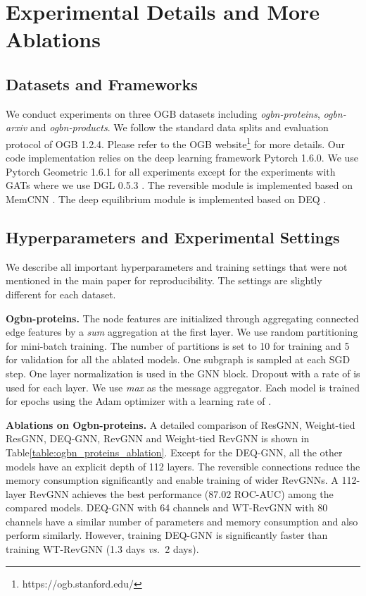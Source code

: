 \documentclass{article}
\newcommand{\vs}{\emph{vs.~}}
\newcommand{\tblLabel}{Table\xspace}
\newcommand{\mysection}[1]{\vspace{0pt}\noindent\textbf{#1.}}
\begin{document}
\section{Experimental Details and More Ablations}

\subsection{Datasets and Frameworks}
We conduct experiments on three OGB datasets \citep{hu2020open} including \textit{ogbn-proteins}, \textit{ogbn-arxiv} and \textit{ogbn-products}. We follow the standard data splits and evaluation protocol of OGB 1.2.4. Please refer to the OGB website\footnote{https://ogb.stanford.edu/} for more details. Our code implementation relies on the deep learning framework Pytorch 1.6.0. We use Pytorch Geometric 1.6.1 \citep{Fey/Lenssen/2019} for all experiments except for the experiments with GATs where we use DGL 0.5.3 \citep{wang2019dgl}. The reversible module is implemented based on MemCNN \citep{vandeLeemput2019MemCNN}. The deep equilibrium module is implemented based on DEQ \citep{bai2019deep}.

\subsection{Hyperparameters and Experimental Settings}
We describe all important hyperparameters and training settings that were not mentioned in the main paper for reproducibility. The settings are slightly different for each dataset.

\mysection{Ogbn-proteins} The node features are initialized through aggregating connected edge features by a \emph{sum} aggregation at the first layer. We use random partitioning for mini-batch training. The number of partitions is set to 10 for training and 5 for validation for all the ablated models. One subgraph is sampled at each SGD step. One layer normalization is used in the GNN block. Dropout with a rate of  is used for each layer. We use \emph{max} as the message aggregator. Each model is trained for  epochs using the Adam optimizer with a learning rate of .

\mysection{Ablations on Ogbn-proteins}
A detailed comparison of ResGNN, Weight-tied ResGNN, DEQ-GNN, RevGNN and Weight-tied RevGNN is shown in \tblLabel \ref{table:ogbn_proteins_ablation}. Except for the DEQ-GNN, all the other models have an explicit depth of 112 layers. The reversible connections reduce the memory consumption significantly and enable training of wider RevGNNs. A 112-layer RevGNN achieves the best performance (87.02 ROC-AUC) among the compared models. DEQ-GNN with 64 channels and WT-RevGNN with 80 channels have a similar number of parameters and memory consumption and also perform similarly. However, training DEQ-GNN is significantly faster than training WT-RevGNN (1.3 days \vs 2 days).
\end{document}
